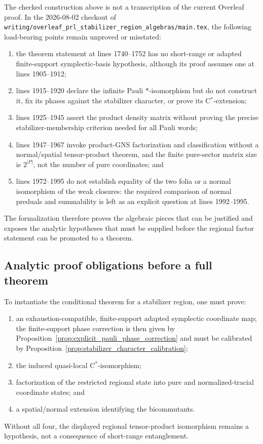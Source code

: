 \documentclass{article}
\begin{document}
The checked construction above is not a transcription of the current Overleaf
proof.  In the 2026-08-02 checkout of
\texttt{writing/overleaf\_prl\_stabilizer\_region\_algebras/main.tex}, the
following load-bearing points remain unproved or misstated:
\begin{enumerate}
\item the theorem statement at lines 1740--1752 has no short-range or adapted
finite-support symplectic-basis hypothesis, although its proof assumes one at
lines 1905--1912;
\item lines 1915--1920 declare the infinite Pauli \(*\)-isomorphism but do
not construct it, fix its phases against the stabilizer character, or prove
its C\(^*\)-extension;
\item lines 1925--1945 assert the product density matrix without proving the
precise stabilizer-membership criterion needed for all Pauli words;
\item lines 1947--1967 invoke product-GNS factorization and classification
without a normal/spatial tensor-product theorem, and the finite pure-sector
matrix size is \(2^{\lvert P\rvert}\), not the number of pure coordinates;
and
\item lines 1972--1995 do not establish equality of the two folia or a normal
isomorphism of the weak closures: the required comparison of normal preduals
and summability is left as an explicit question at lines 1992--1995.
\end{enumerate}
The formalization therefore proves the algebraic pieces that can be justified
and exposes the analytic hypotheses that must be supplied before the regional
factor statement can be promoted to a theorem.

\subsection*{Analytic proof obligations before a full theorem}

To instantiate the conditional theorem for a stabilizer region, one must prove:
\begin{enumerate}
\item an exhaustion-compatible, finite-support adapted symplectic coordinate
map; the finite-support phase correction is then given by
Proposition~\ref{prop:explicit_pauli_phase_correction} and must be calibrated
by Proposition~\ref{prop:stabilizer_character_calibration};
\item the induced quasi-local C\(^*\)-isomorphism;
\item factorization of the restricted regional state into pure and normalized-tracial
coordinate states; and
\item a spatial/normal extension identifying the bicommutants.
\end{enumerate}
Without all four, the displayed regional tensor-product isomorphism remains a
hypothesis, not a consequence of short-range entanglement.
\end{document}
